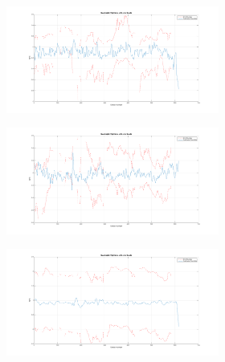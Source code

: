 \begin{figure}
  \centering
  \begin{subfigure}{0.48\textwidth}
    \begin{subfigure}{\textwidth}
      \includegraphics[clip, trim = 100 0 100 0, width = \textwidth]{figures/chapter5/x}
    \end{subfigure}
    \begin{subfigure}{\textwidth}
      \includegraphics[clip, trim = 100 0 100 0, width = \textwidth]{figures/chapter5/y}
    \end{subfigure}
    \begin{subfigure}{\textwidth}
      \includegraphics[clip, trim = 100 0 100 0, width = \textwidth]{figures/chapter5/z}

\end{subfigure}
\end{subfigure}
\end{figure}
